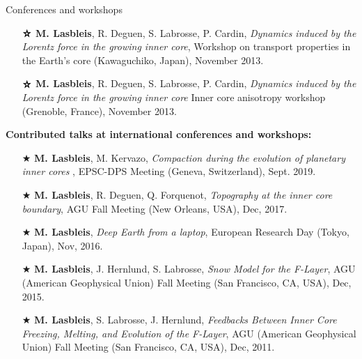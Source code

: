 \documentclass{cv}
\newcommand\openbigstar[1][0.4]{%
  \scalerel*{%
    \stackinset{c}{-.125pt}{c}{}{\scalebox{#1}{\color{white}{$\bigstar$}}}{%
      $\bigstar$}%
  }{\bigstar}
}
\begin{document}
\begin{rubrique}{Conferences and workshops}
\begin{itemize}[parsep=-2pt]
	\item[$\openbigstar$] \textbf{M. Lasbleis}, R. Deguen, S. Labrosse, P. Cardin, \textit{Dynamics induced by the Lorentz force in the growing inner core}, Workshop on transport properties in the Earth's core (Kawaguchiko, Japan), November 2013.
	\item[$\openbigstar$] \textbf{M. Lasbleis}, R. Deguen, S. Labrosse, P. Cardin, \textit{Dynamics induced by the Lorentz force in the growing inner core} Inner core anisotropy workshop (Grenoble, France), November 2013. 
				
\end{itemize}


\textbf{Contributed talks at international conferences and workshops:}

\begin{itemize}[parsep=-2pt]
	\item[$\bigstar$] \textbf{M. Lasbleis}, M. Kervazo, \textit{Compaction during the evolution of planetary inner cores }, EPSC-DPS Meeting (Geneva, Switzerland), Sept. 2019.
	\item[$\bigstar$] \textbf{M. Lasbleis}, R. Deguen, Q. Forquenot, \textit{Topography at the inner core boundary}, AGU Fall Meeting (New Orleans, USA), Dec, 2017.
	\item[$\bigstar$]   \textbf{M. Lasbleis}, \textit{Deep Earth from a laptop}, European Research Day (Tokyo, Japan), Nov, 2016.
	\item[$\bigstar$] \textbf{M. Lasbleis}, J. Hernlund, S. Labrosse, \textit{Snow Model for the F-Layer}, AGU (American Geophysical Union) Fall Meeting (San Francisco, CA, USA), Dec, 2015.
	\item[$\bigstar$] \textbf{M. Lasbleis}, S. Labrosse, J. Hernlund, \textit{Feedbacks Between Inner Core Freezing, Melting, and Evolution of the F-Layer}, AGU (American Geophysical Union) Fall Meeting (San Francisco, CA, USA), Dec, 2011.
\end{itemize}


\end{rubrique}
\end{document}

